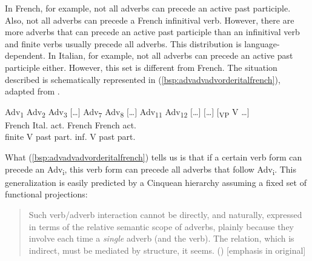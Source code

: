 In French, for example, not all adverbs can precede an active past participle. Also, not all adverbs can precede a French infinitival verb. However, there are more adverbs that can precede an active past participle than an infinitival verb and finite verbs usually precede all adverbs. This distribution is language-dependent. In Italian, for example, not all adverbs can precede an active past participle either. However, this set is different from French. The situation described is schematically represented in (\ref{bsp:advadvadvorderitalfrench}), adapted from \citet[686]{cinque2004issues}.

\begin{exe}
\ex\label{bsp:advadvadvorderitalfrench} 
\begin{adjustbox}{max width=1.0\textwidth}
\glll {\hspace*{3ex}\textbullet } {Adv\textsubscript{1}} {Adv\textsubscript{2}} {Adv\textsubscript{3}} {$[$\dots$]$} {Adv\textsubscript{7}} {\hspace*{4ex}\textbullet } {Adv\textsubscript{8}} {$[$\dots$]$} {Adv\textsubscript{11}} {\hspace*{3ex}\textbullet } {Adv\textsubscript{12}} {$[$\dots$]$} {\hspace*{5ex}\textbullet } {$[$\dots$]$} {$[$\textsubscript{VP} V \dots$]$} \\
{\hspace*{0.5ex}French} {} {} {} {} {} {\hspace*{0.5ex}Ital. act.} {} {} {} {\hspace*{0.5ex}French} {} {} {\hspace*{0.5ex}French act.} {} {}\\
{\hspace*{0.2ex}finite V} {} {} {} {} {} {past part.} {} {} {} {\hspace*{1ex}inf. V} {} {} {\hspace*{1.8ex}past part.} {} {}\\
\end{adjustbox}
\end{exe}

\noindent What (\ref{bsp:advadvadvorderitalfrench}) tells us is that if a certain verb form can precede an Adv\textsubscript{i}, this verb form can precede all adverbs that follow Adv\textsubscript{i}. This generalization is easily predicted by a Cinquean hierarchy assuming a fixed set of functional projections:

\begin{quote}
Such verb/adverb interaction cannot be directly, and naturally, expressed in terms of the relative semantic scope of adverbs, plainly because they involve each time a \textit{single} adverb (and the verb). The relation, which is indirect, must be mediated by structure, it seems. (\citealt[686]{cinque2004issues}) [emphasis in original]
\end{quote}

